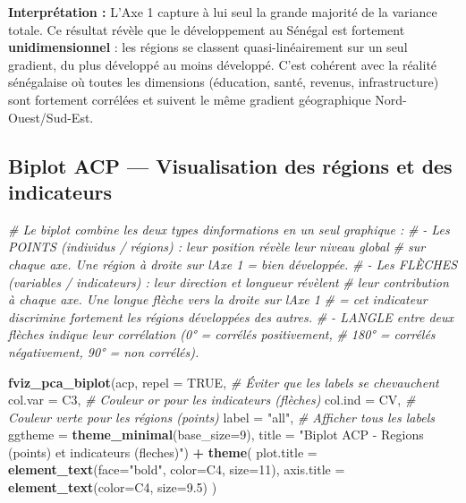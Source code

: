 \documentclass[
]{article}
\newenvironment{Shaded}{\begin{snugshade}}{\end{snugshade}}
\newcommand{\AttributeTok}[1]{\textcolor[rgb]{0.13,0.29,0.53}{#1}}
\newcommand{\CommentTok}[1]{\textcolor[rgb]{0.56,0.35,0.01}{\textit{#1}}}
\newcommand{\ConstantTok}[1]{\textcolor[rgb]{0.56,0.35,0.01}{#1}}
\newcommand{\DecValTok}[1]{\textcolor[rgb]{0.00,0.00,0.81}{#1}}
\newcommand{\FloatTok}[1]{\textcolor[rgb]{0.00,0.00,0.81}{#1}}
\newcommand{\FunctionTok}[1]{\textcolor[rgb]{0.13,0.29,0.53}{\textbf{#1}}}
\newcommand{\NormalTok}[1]{#1}
\newcommand{\SpecialCharTok}[1]{\textcolor[rgb]{0.81,0.36,0.00}{\textbf{#1}}}
\newcommand{\StringTok}[1]{\textcolor[rgb]{0.31,0.60,0.02}{#1}}
\begin{document}
\textbf{Interprétation :} L'Axe 1 capture à lui seul la grande majorité
de la variance totale. Ce résultat révèle que le développement au
Sénégal est fortement \textbf{unidimensionnel} : les régions se classent
quasi-linéairement sur un seul gradient, du plus développé au moins
développé. C'est cohérent avec la réalité sénégalaise où toutes les
dimensions (éducation, santé, revenus, infrastructure) sont fortement
corrélées et suivent le même gradient géographique Nord-Ouest/Sud-Est.

\subsection{Biplot ACP --- Visualisation des régions et des
indicateurs}\label{biplot-acp-visualisation-des-ruxe9gions-et-des-indicateurs}

\begin{Shaded}
\begin{Highlighting}[]
\CommentTok{\# Le biplot combine les deux types d\textquotesingle{}informations en un seul graphique :}
\CommentTok{\# {-} Les POINTS (individus / régions) : leur position révèle leur niveau global}
\CommentTok{\#   sur chaque axe. Une région à droite sur l\textquotesingle{}Axe 1 = bien développée.}
\CommentTok{\# {-} Les FLÈCHES (variables / indicateurs) : leur direction et longueur révèlent}
\CommentTok{\#   leur contribution à chaque axe. Une longue flèche vers la droite sur l\textquotesingle{}Axe 1}
\CommentTok{\#   = cet indicateur discrimine fortement les régions développées des autres.}
\CommentTok{\# {-} L\textquotesingle{}ANGLE entre deux flèches indique leur corrélation (0° = corrélés positivement,}
\CommentTok{\#   180° = corrélés négativement, 90° = non corrélés).}

\FunctionTok{fviz\_pca\_biplot}\NormalTok{(acp,}
  \AttributeTok{repel   =} \ConstantTok{TRUE}\NormalTok{,         }\CommentTok{\# Éviter que les labels se chevauchent}
  \AttributeTok{col.var =}\NormalTok{ C3,           }\CommentTok{\# Couleur or pour les indicateurs (flèches)}
  \AttributeTok{col.ind =}\NormalTok{ CV,           }\CommentTok{\# Couleur verte pour les régions (points)}
  \AttributeTok{label   =} \StringTok{"all"}\NormalTok{,        }\CommentTok{\# Afficher tous les labels}
  \AttributeTok{ggtheme =} \FunctionTok{theme\_minimal}\NormalTok{(}\AttributeTok{base\_size=}\DecValTok{9}\NormalTok{),}
  \AttributeTok{title   =} \StringTok{"Biplot ACP {-} Regions (points) et indicateurs (fleches)"}\NormalTok{) }\SpecialCharTok{+}
  \FunctionTok{theme}\NormalTok{(}
    \AttributeTok{plot.title =} \FunctionTok{element\_text}\NormalTok{(}\AttributeTok{face=}\StringTok{"bold"}\NormalTok{, }\AttributeTok{color=}\NormalTok{C4, }\AttributeTok{size=}\DecValTok{11}\NormalTok{),}
    \AttributeTok{axis.title =} \FunctionTok{element\_text}\NormalTok{(}\AttributeTok{color=}\NormalTok{C4, }\AttributeTok{size=}\FloatTok{9.5}\NormalTok{)}
\NormalTok{  )}
\end{Highlighting}
\end{Shaded}
\end{document}
